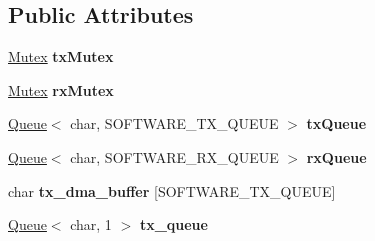 \subsection*{Public Attributes}
\begin{DoxyCompactItemize}
\item 
\hypertarget{classmiosix_1_1_serial_data_a403734b596394e6063f69b83d20b0f19}{\hyperlink{classmiosix_1_1_mutex}{Mutex} {\bfseries tx\-Mutex}}\label{classmiosix_1_1_serial_data_a403734b596394e6063f69b83d20b0f19}

\item 
\hypertarget{classmiosix_1_1_serial_data_ab6281405c311f5e5f72bb6c0116435a3}{\hyperlink{classmiosix_1_1_mutex}{Mutex} {\bfseries rx\-Mutex}}\label{classmiosix_1_1_serial_data_ab6281405c311f5e5f72bb6c0116435a3}

\item 
\hypertarget{classmiosix_1_1_serial_data_a381f38007a14d1cbcb1e51fbfc30541c}{\hyperlink{classmiosix_1_1_queue}{Queue}$<$ char, S\-O\-F\-T\-W\-A\-R\-E\-\_\-\-T\-X\-\_\-\-Q\-U\-E\-U\-E $>$ {\bfseries tx\-Queue}}\label{classmiosix_1_1_serial_data_a381f38007a14d1cbcb1e51fbfc30541c}

\item 
\hypertarget{classmiosix_1_1_serial_data_a647700cc9d6116aa373836c8e7256173}{\hyperlink{classmiosix_1_1_queue}{Queue}$<$ char, S\-O\-F\-T\-W\-A\-R\-E\-\_\-\-R\-X\-\_\-\-Q\-U\-E\-U\-E $>$ {\bfseries rx\-Queue}}\label{classmiosix_1_1_serial_data_a647700cc9d6116aa373836c8e7256173}

\item 
\hypertarget{classmiosix_1_1_serial_data_a25c92fd3b88af915d2cb829d13a980f2}{char {\bfseries tx\-\_\-dma\-\_\-buffer} \mbox{[}S\-O\-F\-T\-W\-A\-R\-E\-\_\-\-T\-X\-\_\-\-Q\-U\-E\-U\-E\mbox{]}}\label{classmiosix_1_1_serial_data_a25c92fd3b88af915d2cb829d13a980f2}

\item 
\hypertarget{classmiosix_1_1_serial_data_ab858717f5b6dfc9378a04816428f8055}{\hyperlink{classmiosix_1_1_queue}{Queue}$<$ char, 1 $>$ {\bfseries tx\-\_\-queue}}\label{classmiosix_1_1_serial_data_ab858717f5b6dfc9378a04816428f8055}

\end{DoxyCompactItemize}
